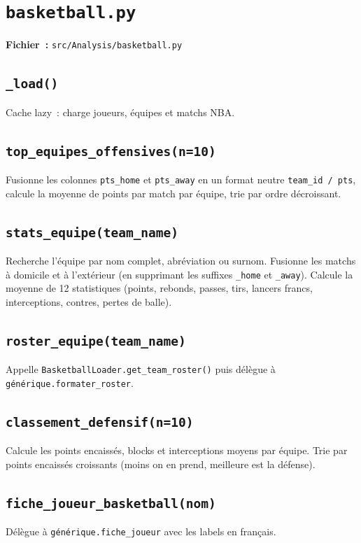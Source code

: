 \documentclass[12pt,a4paper]{article}
\begin{document}
\section{\texttt{basketball.py}}

\textbf{Fichier~:} \texttt{src/Analysis/basketball.py}

\subsection{\texttt{\_load()}}
Cache lazy~: charge joueurs, équipes et matchs NBA.

\subsection{\texttt{top\_equipes\_offensives(n=10)}}
Fusionne les colonnes \texttt{pts\_home} et \texttt{pts\_away} en un format
neutre \texttt{team\_id / pts}, calcule la moyenne de points par match par
équipe, trie par ordre décroissant.

\subsection{\texttt{stats\_equipe(team\_name)}}
Recherche l'équipe par nom complet, abréviation ou surnom. Fusionne les matchs
à domicile et à l'extérieur (en supprimant les suffixes \texttt{\_home} et
\texttt{\_away}). Calcule la moyenne de 12 statistiques (points, rebonds,
passes, tirs, lancers francs, interceptions, contres, pertes de balle).

\subsection{\texttt{roster\_equipe(team\_name)}}
Appelle \texttt{BasketballLoader.get\_team\_roster()} puis délègue à
\texttt{générique.formater\_roster}.

\subsection{\texttt{classement\_defensif(n=10)}}
Calcule les points encaissés, blocks et interceptions moyens par équipe.
Trie par points encaissés croissants (moins on en prend, meilleure est la
défense).

\subsection{\texttt{fiche\_joueur\_basketball(nom)}}
Délègue à \texttt{générique.fiche\_joueur} avec les labels en français.
\end{document}
